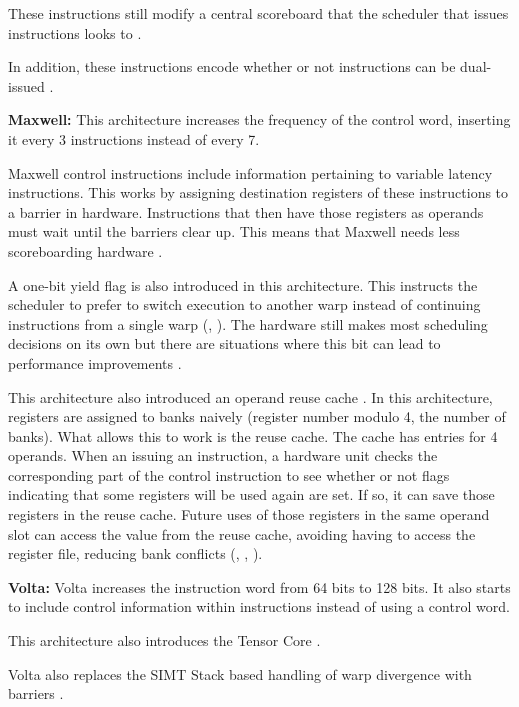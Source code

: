 These instructions still modify a central scoreboard that the scheduler that
issues instructions looks to \cite{chipsandcheeseInsideKepler} \cite{adalbert2022pastis}.

In addition, these instructions encode whether or not instructions can be dual-issued \cite{chipsandcheeseInsideKepler}.

\textbf{Maxwell:} This architecture increases the frequency of the control word,
inserting it every 3 instructions instead of every 7. 

Maxwell control instructions include information pertaining to variable latency
instructions. This works by assigning destination registers of these instructions
to a barrier in hardware. Instructions that then have those
registers as operands must wait until the barriers clear up. This means
that Maxwell needs less scoreboarding hardware \cite{chipsandcheeseMaxwellNvidias}.

A one-bit yield flag is also introduced in this architecture. This instructs
the scheduler to prefer to switch execution to another warp instead of continuing
instructions from a single warp (\cite{githubControlCodes}, \cite{jia2018dissecting}). 
The hardware still makes most scheduling decisions on its own but there are
situations where this bit can lead to performance improvements \cite{githubControlCodes}.

This architecture also introduced an operand reuse cache \cite{chipsandcheeseMaxwellNvidias}. 
In this architecture, registers are assigned to banks naively (register number modulo 4, the number of banks).
What allows this to work is the reuse cache. The cache has entries for 4 operands.
When an issuing an instruction, a hardware unit checks the corresponding part of the control instruction
to see whether or not flags indicating that some registers will be used again are set.
If so, it can save those registers in the reuse cache. Future uses of those
registers in the same operand slot can access the value from the reuse cache,
avoiding having to access the register file, reducing bank conflicts (\cite{jia2018dissecting}, \cite{githubSGEMM}, \cite{chipsandcheeseMaxwellNvidias}).

\textbf{Volta:} Volta increases the instruction word from 64 bits to 128 bits.
It also starts to include control information within instructions instead of
using a control word\cite{jia2018dissecting}.

This architecture also introduces the Tensor Core \cite{sun2022dissecting}.

Volta also replaces the SIMT Stack based handling of warp divergence with
barriers \cite{aamodt2018general}.
